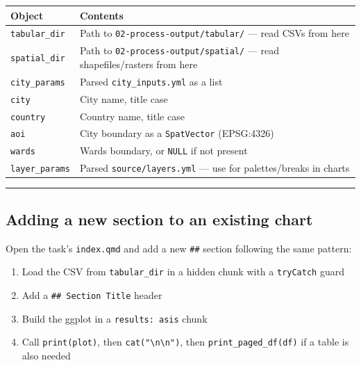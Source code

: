 \documentclass[
  letterpaper,
  DIV=11,
  numbers=noendperiod]{scrreprt}
\newcounter{none} %
\providecommand{\tightlist}{%
  \setlength{\itemsep}{0pt}\setlength{\parskip}{0pt}}
\begin{document}
{\def\LTcaptype{none} %
\begin{longtable}[]{@{}
  >{\raggedright\arraybackslash}p{}
  >{\raggedright\arraybackslash}p{}@{}}
\toprule\noalign{}
\begin{minipage}[b]{\linewidth}\raggedright
Object
\end{minipage} & \begin{minipage}[b]{\linewidth}\raggedright
Contents
\end{minipage} \\
\midrule\noalign{}
\endhead
\bottomrule\noalign{}
\endlastfoot
\texttt{tabular\_dir} & Path to \texttt{02-process-output/tabular/} ---
read CSVs from here \\
\texttt{spatial\_dir} & Path to \texttt{02-process-output/spatial/} ---
read shapefiles/rasters from here \\
\texttt{city\_params} & Parsed \texttt{city\_inputs.yml} as a list \\
\texttt{city} & City name, title case \\
\texttt{country} & Country name, title case \\
\texttt{aoi} & City boundary as a \texttt{SpatVector} (EPSG:4326) \\
\texttt{wards} & Wards boundary, or \texttt{NULL} if not present \\
\texttt{layer\_params} & Parsed \texttt{source/layers.yml} --- use for
palettes/breaks in charts \\
\end{longtable}
}

\begin{center}\rule{0.5\linewidth}{0.5pt}\end{center}

\subsection{Adding a new section to an existing
chart}\label{adding-a-new-section-to-an-existing-chart}

Open the task's \texttt{index.qmd} and add a new \texttt{\#\#} section
following the same pattern:

\begin{enumerate}
\def\labelenumi{\arabic{enumi}.}
\tightlist
\item
  Load the CSV from \texttt{tabular\_dir} in a hidden chunk with a
  \texttt{tryCatch} guard
\item
  Add a \texttt{\#\#\ Section\ Title} header
\item
  Build the ggplot in a \texttt{results:\ asis} chunk
\item
  Call \texttt{print(plot)}, then
  \texttt{cat("\textbackslash{}n\textbackslash{}n")}, then
  \texttt{print\_paged\_df(df)} if a table is also needed
\end{enumerate}
\end{document}
